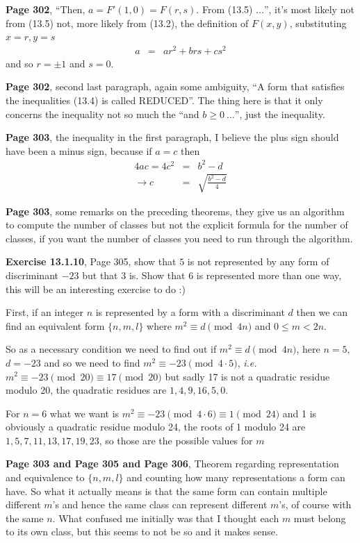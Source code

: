 \documentclass[aps,preprint,preprintnumbers,nofootinbib,showpacs,prd]{revtex4-1}
\newcommand{\ie}{{\it i.e.} }
\newcommand{\nbea}{\begin{eqnarray*}}
\newcommand{\neea}{\end{eqnarray*}}
\begin{document}
{\bf Page 302}, ``Then, $a=F'(1,0)=F(r,s)$. From (13.5) $\ldots$'', it's most likely not from (13.5) not, more likely from (13.2), the definition of $F(x,y)$, substituting $x=r, y=s$
%
\nbea
a & = & ar^2 + brs + cs^2
\neea
%
and so $r = \pm1$ and $s=0$.

{\bf Page 302}, second last paragraph, again some ambiguity, ``A form that satisfies the inequalities (13.4) is called REDUCED''. The thing here is that it only concerns the inequality not so much the ``and $b\ge0~\ldots$'', just the inequality. 

{\bf Page 303}, the inequality in the first paragraph, I believe the plus sign should have been a minus sign, because if $a=c$ then
%
\nbea
4ac = 4c^2 & = & b^2 - d \\
\to c & = & \sqrt{\frac{b^2 - d}{4}}
\neea
%

{\bf Page 303}, some remarks on the preceding theorems, they give us an algorithm to compute the number of classes but not the explicit formula for the number of classes, if you want the number of classes you need to run through the algorithm.

{\bf Exercise 13.1.10}, Page 305, show that $5$ is not represented by any form of discriminant $-23$ but that 3 is. Show that $6$ is represented more than one way, this will be an interesting exercise to do :)

First, if an integer $n$ is represented by a form with a discriminant $d$ then we can find an equivalent form $\{n,m,l\}$ where $m^2 \equiv d \pmod{4n}$ and $0\le m<2n$.

So as a necessary condition we need to find out if $m^2 \equiv d \pmod{4n}$, here $n=5$, $d=-23$ and so we need to find $m^2 \equiv -23 \pmod{4\cdot5}$, \ie $m^2 \equiv -23 \pmod{20} \equiv 17 \pmod{20}$ but sadly 17 is not a quadratic residue modulo 20, the quadratic residues are $1,4,9,16,5,0$.

For $n=6$ what we want is $m^2 \equiv -23 \pmod{4\cdot6} \equiv 1 \pmod{24}$ and 1 is obviously a quadratic residue modulo 24, the roots of 1 modulo 24 are $1, 5, 7, 11,13,17,19,23$, so those are the possible values for $m$

{\bf Page 303 and Page 305 and Page 306}, Theorem regarding representation and equivalence to $\{n,m,l\}$ and counting how many representations a form can have. So what it actually means is that the same form can contain multiple different $m$'s and hence the same class can represent different $m$'s, of course with the same $n$. What confused me initially was that I thought each $m$ must belong to its own class, but this seems to not be so and it makes sense.
\end{document}
